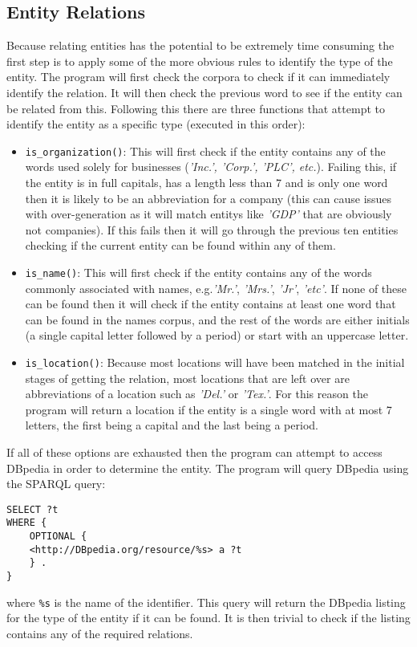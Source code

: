 \documentclass[draft]{article}
\begin{document}
\begin{multicols*}{2}
\section*{Entity Relations}
Because relating entities has the potential to be extremely time consuming the first step is to apply some of the more obvious rules to identify the type of the entity. The program will first check the corpora to check if it can immediately identify the relation. It will then check the previous word to see if the entity can be related from this. Following this there are three functions that attempt to identify the entity as a specific type (executed in this order):
\begin{itemize}
\item \texttt{is\_organization()}: This will first check if the entity contains any of the words used solely for businesses (\textit{'Inc.', 'Corp.', 'PLC', etc.}). Failing this, if the entity is in full capitals, has a length less than 7 and is only one word then it is likely to be an abbreviation for a company (this can cause issues with over-generation as it will match entitys like \textit{'GDP'} that are obviously not companies). If this fails then it will go through the previous ten entities checking if the current entity can be found within any of them.
\item \texttt{is\_name()}: This will first check if the entity contains any of the words commonly associated with names, e.g.\textit{'Mr.'}, \textit{'Mrs.'}, \textit{'Jr'}, \textit{'etc'}. If none of these can be found then it will check if the entity contains at least one word that can be found in the names corpus, and the rest of the words are either initials (a single capital letter followed by a period) or start with an uppercase letter.
\item \texttt{is\_location()}: Because most locations will have been matched in the initial stages of getting the relation, most locations that are left over are abbreviations of a location such as \textit{'Del.'} or \textit{'Tex.'}. For this reason the program will return a location if the entity is a single word with at most 7 letters, the first being a capital and the last being a period. 
\end{itemize}

If all of these options are exhausted then the program can attempt to access DBpedia in order to determine the entity. The program will query DBpedia using the SPARQL \citep{SPARQL} query:
\begin{verbatim}
SELECT ?t
WHERE {
	OPTIONAL { 
	<http://DBpedia.org/resource/%s> a ?t 
	} .
}
\end{verbatim}
where \texttt{\%s} is the name of the identifier. This query will return the DBpedia listing for the type of the entity if it can be found. It is then trivial to check if the listing contains any of the required relations. 


\end{multicols*}
\end{document}
